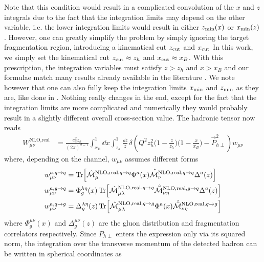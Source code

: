 Note that this condition would result in a complicated convolution of the $x$ and $z$ integrals due to the fact that the integration limits may depend on the other variable, i.e. the lower integration limits would result in either $z_{\rm min}(x)$ or $x_{\rm min}(z)$. However, one can greatly simplify the problem by simply ignoring the target fragmentation region, introducing a kinematical cut $z_{\rm cut}$ and $x_{\rm cut}$ \cite{Sissakian_2004} In this work, we simply set the kinematical cut $z_{\rm cut}\approx z_h$ and $x_{\rm cut}\approx x_B$. With this prescription, the integration variables must satisfy $z>z_h$ and $x>x_B$ and our formulae match many results already available in the literature \cite{de_Florian_1998,Koike_2006}. We note however that one can also fully keep the integration limits $x_{\rm min}$ and $z_{\rm min}$ as they are, like done in \cite{kanazawa_contribution_2013}. Nothing really changes in the end, except for the fact that the integration limits are more complicated and numerically they would probably result in a slightly different overall cross-section value. The hadronic tensor now reads
\begin{equation}
\begin{aligned}
      W_{\mu\nu}^{\text{NLO,real}}&=\frac{e_a^2z_h}{(2\pi)^{d-1}} \int_{x_B}^{1} \dd x\int_{z_h}^{1}  \frac{\dd z}{z}\,\delta\left(Q^2z_h^2\Big(1-\frac{z}{z_h} \Big)\Big(1-\frac{x}{x_B}\Big) - \vec P_{h\perp}^2\right)w_{\mu\nu}
\end{aligned}
\end{equation}
where, depending on the channel, $w_{\mu\nu}$ assumes different forms
\begin{equation}
    \begin{aligned}
        w_{\mu\nu}^{a,q \to q}&=\Tr[\hat{\mathcal{M}}_\mu^{\text{NLO,real},q \to q}\Phi^a(x)\hat{\bar{\mathcal{M}}}_\nu^{\text{NLO,real},q \to q}\Delta^a(z)]\\
        w_{\mu\nu}^{a,g \to q}&=\Phi_g^{\lambda\eta}(x)\Tr[\hat{\mathcal{M}}_{\mu\lambda}^{\text{NLO,real},g \to q}\hat{\bar{\mathcal{M}}}_{\nu\eta}^{\text{NLO,real},g \to q}\Delta^a(z)]\\
        w_{\mu\nu}^{a,q \to g}&=\Delta_g^{\lambda\eta}(z)\Tr[\hat{\mathcal{M}}_{\mu\lambda}^{\text{NLO,real},q \to g}\Phi^a(x)\hat{\bar{\mathcal{M}}}_{\nu\eta}^{\text{NLO,real},q \to g}]
    \end{aligned}
\end{equation}
where $\Phi^{\mu\nu}_g(x)$ and $\Delta_g^{\mu\nu}(z)$ are the gluon distribution and fragmentation correlators respectively. Since $P_{h\perp}$ enters the expression only via its squared norm, the integration over the transverse momentum of the detected hadron can be written in spherical coordinates as
